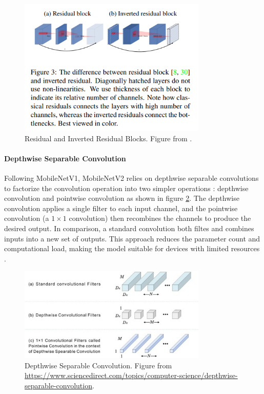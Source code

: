 \begin{figure}[ht]
    \centering
    \includegraphics[width=0.8\textwidth]{Images/inverted_residual.png} 
    \caption{Residual and Inverted Residual Blocks. Figure from \cite{sandler2018mobilenetv2}. }
    \label{fig:residual}
\end{figure}

\paragraph{Depthwise Separable Convolution}
Following MobileNetV1, MobileNetV2 relies on depthwise separable convolutions to factorize the convolution operation into two simpler operations \cite{howard2017mobilenetsefficientconvolutionalneural}: depthwise convolution and pointwise convolution as shown in figure \ref{fig:depthwise_sep_conv}. The depthwise convolution applies a single filter to each input channel, and the pointwise convolution (a $1\times 1$ convolution) then recombines the channels to produce the desired output. In comparison, a standard convolution both filtes and combines inputs into a new set of outputs. This approach reduces the parameter count and computational load, making the model suitable for devices with limited resources \cite{howard2017mobilenetsefficientconvolutionalneural,sandler2018mobilenetv2}.

\begin{figure}[ht]
    \centering
    \includegraphics[width=0.8\textwidth]{Images/depthwise_separable_conv.jpg} 
    \caption{Depthwise Separable Convolution. Figure from \url{https://www.sciencedirect.com/topics/computer-science/depthwise-separable-convolution}. }
    \label{fig:depthwise_sep_conv}
\end{figure}




